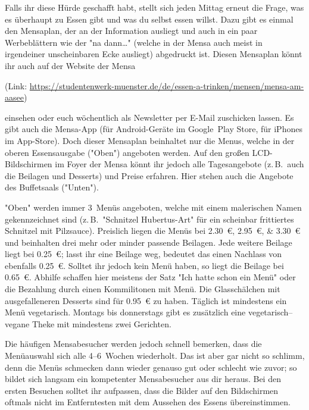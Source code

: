\begin{multicols*}{2}
Falls ihr diese Hürde geschafft habt, stellt sich jeden Mittag erneut die Frage, was es überhaupt zu Essen gibt und was du selbst essen willst.
Dazu gibt es einmal den Mensaplan, der an der Information ausliegt und auch in ein paar Werbeblättern wie der "na dann\dots" (welche in der Mensa auch meist in irgendeiner unscheinbaren Ecke ausliegt) abgedruckt ist.
Diesen Mensaplan könnt ihr auch auf der Website der Mensa

(Link: \url{https://studentenwerk-muenster.de/de/essen-a-trinken/mensen/mensa-am-aasee})

einsehen oder euch wöchentlich als Newsletter per E-Mail zuschicken lassen.
Es gibt auch die Mensa-App (für Android-Geräte im Google~Play Store, für iPhones im App-Store).
Doch dieser Mensaplan beinhaltet nur die Menus, welche in der oberen Essensausgabe ("Oben") angeboten werden.
Auf den großen LCD-Bildschirmen im Foyer der Mensa könnt ihr jedoch alle Tagesangebote (z.\,B.\ auch die Beilagen und Desserts) und Preise erfahren.
Hier stehen auch die Angebote des Buffetsaals ("Unten").

"Oben" werden immer 3~Menüs angeboten, welche mit einem malerischen Namen gekennzeichnet sind (z.\,B.\ "Schnitzel Hubertus-Art" für ein scheinbar frittiertes Schnitzel mit Pilzsauce).
Preislich liegen die Menüs bei \SIlist{2,30; 2,95; 3,30}{\euro} und beinhalten drei mehr oder minder passende Beilagen.
Jede weitere Beilage liegt bei \SI{0,25}{\euro}; lasst ihr eine Beilage weg, bedeutet das einen Nachlass von ebenfalls \SI{0,25}{\euro}.
Solltet ihr jedoch kein Menü haben, so liegt die Beilage bei \SI{0,65}{\euro}.
Abhilfe schaffen hier meistens der Satz "Ich hatte schon ein Menü" oder die Bezahlung durch einen Kommilitonen mit Menü.
Die Glasschälchen mit ausgefalleneren Desserts sind für \SI{0,95}{\euro} zu haben.
Täglich ist mindestens ein Menü vegetarisch.
Montags bis donnerstags gibt es zusätzlich eine vegetarisch--vegane Theke mit mindestens zwei Gerichten.

Die häufigen Mensabesucher werden jedoch schnell bemerken, dass die Menüauswahl sich alle 4--6~Wochen wiederholt.
Das ist aber gar nicht so schlimm, denn die Menüs schmecken dann wieder genauso gut oder schlecht wie zuvor; so bildet sich langsam ein kompetenter Mensabesucher aus dir heraus.
Bei den ersten Besuchen solltet ihr aufpassen, dass die Bilder auf den Bildschirmen oftmals nicht im Entferntesten mit dem Aussehen des Essens übereinstimmen.


\end{multicols*}
